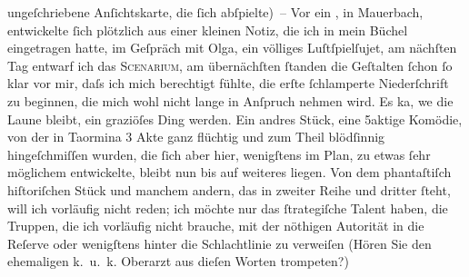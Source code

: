 \begin{ledgroupsized}[t]{13cm}
               ungeſchriebene Anſichtskarte, die ſich abſpielte) –\pend
           \pstart
           Vor ein \label{K_L01422_2v}\label{K_L01422_2h}, in Mauerbach,
               entwickelte ſich plötzlich aus einer kleinen Notiz, die ich in mein Büchel
               eingetragen hatte, im Geſpräch mit Olga, ein
               völliges Luſtſpielſujet, am
               nächſten Tag ent{\pb}warf ich das \textsc{Scenarium}, am übernächſten ſtanden die Geſtalten ſchon ſo klar vor mir, daſs
               ich mich berechtigt fühlte, die erſte ſchlamperte Niederſchrift zu beginnen, die mich
               wohl nicht lange in Anſpruch nehmen wird. Es ka{\geminationn}, we{\geminationn} die Laune bleibt, ein graziöſes Ding werden. Ein
               andres Stück, eine 5aktige
                  Komödie, von der in Taormina 3 Akte ganz
               flüchtig und zum Theil blödſinnig hingeſchmiſſen wurden, die ſich aber hier,
               wenigſtens im Plan, zu etwas ſehr möglichem entwickelte, {\pb}bleibt nun bis auf weiteres liegen. Von dem phantaſtiſch hiſtoriſchen Stück und manchem andern, das in
               zweiter Reihe und dritter ſteht, will ich vorläufig nicht reden; ich möchte nur das
               ſtrategiſche Talent haben, die Truppen, die ich vorläufig nicht brauche, mit der
               nöthigen Autorität in die Reſerve oder wenigſtens hinter die Schlachtlinie zu
               verweiſen (Hören Sie den ehemaligen k. u. k. Oberarzt aus dieſen Worten trompeten?)

\end{ledgroupsized}

